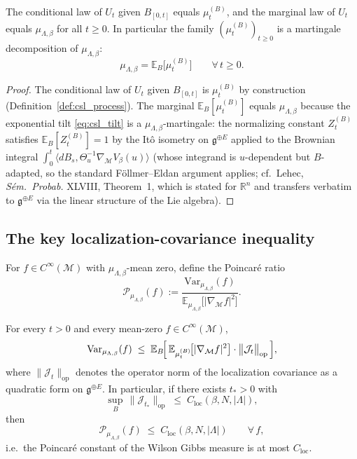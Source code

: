 \begin{lemma}
\label{lem:follmer_drift}
The conditional law of $U_{t}$ given $B_{[0,t]}$ equals $\mu_{t}^{(B)}$,
and the marginal law of $U_{t}$ equals $\mu_{\Lambda,\beta}$ for all
$t\ge 0$. In particular the family $(\mu_{t}^{(B)})_{t\ge 0}$ is a
martingale decomposition of $\mu_{\Lambda,\beta}$:
\[
  \mu_{\Lambda,\beta} = \mathbb{E}_{B}\!\bigl[\mu_{t}^{(B)}\bigr]
  \qquad\forall\,t\ge 0.
\]
\end{lemma}

\begin{proof}
The conditional law of $U_{t}$ given $B_{[0,t]}$ is $\mu_{t}^{(B)}$ by
construction (Definition~\ref{def:csl_process}). The marginal
$\mathbb{E}_{B}[\mu_{t}^{(B)}]$ equals $\mu_{\Lambda,\beta}$ because
the exponential tilt \eqref{eq:csl_tilt} is a $\mu_{\Lambda,\beta}$-martingale:
the normalizing constant $Z_{t}^{(B)}$ satisfies
$\mathbb{E}_{B}[Z_{t}^{(B)}]=1$ by the It\^o isometry on
$\mathfrak{g}^{\oplus E}$ applied to the Brownian integral
$\int_{0}^{t}\langle dB_{s},\Theta_{u}^{-1}\nabla_{\mathcal{M}}V_{\beta}(u)\rangle$
(whose integrand is $u$-dependent but $B$-adapted, so the standard
F\"{o}llmer--Eldan argument applies; cf.\ Lehec, \emph{S\'em.\
Probab.} XLVIII, Theorem~1, which is stated for $\mathbb{R}^{n}$ and
transfers verbatim to $\mathfrak{g}^{\oplus E}$ via the linear
structure of the Lie algebra).
\end{proof}

\subsection{The key localization-covariance inequality}
\label{ssec:csl_key}

For $f\in C^{\infty}(\mathcal{M})$ with $\mu_{\Lambda,\beta}$-mean
zero, define the Poincar\'{e} ratio
\[
  \mathcal{P}_{\mu_{\Lambda,\beta}}(f)
  := \frac{\mathrm{Var}_{\mu_{\Lambda,\beta}}(f)}
          {\mathbb{E}_{\mu_{\Lambda,\beta}}\!\bigl[|\nabla_{\mathcal{M}}f|^{2}\bigr]}.
\]

\begin{theorem}
\label{thm:csl_poincare}
For every $t>0$ and every mean-zero $f\in C^{\infty}(\mathcal{M})$,
\begin{equation}
\label{eq:csl_poincare}
  \mathrm{Var}_{\mu_{\Lambda,\beta}}(f)
  \;\le\;
  \mathbb{E}_{B}\!\Bigl[\,
    \mathbb{E}_{\mu_{t}^{(B)}}\!\bigl[|\nabla_{\mathcal{M}}f|^{2}\bigr]
    \cdot
    \bigl\|\mathcal{J}_{t}\bigr\|_{\mathrm{op}}
  \,\Bigr],
\end{equation}
where $\|\mathcal{J}_{t}\|_{\mathrm{op}}$ denotes the operator norm
of the localization covariance as a quadratic form on
$\mathfrak{g}^{\oplus E}$. In particular, if there exists $t_{*}>0$
with
\[
  \sup_{B}\,\bigl\|\mathcal{J}_{t_{*}}\bigr\|_{\mathrm{op}} \;\le\; C_{\mathrm{loc}}(\beta,N,|\Lambda|),
\]
then
\[
  \mathcal{P}_{\mu_{\Lambda,\beta}}(f) \;\le\; C_{\mathrm{loc}}(\beta,N,|\Lambda|)
  \qquad\forall\,f,
\]
i.e.\ the Poincar\'{e} constant of the Wilson Gibbs measure is at most
$C_{\mathrm{loc}}$.
\end{theorem}

